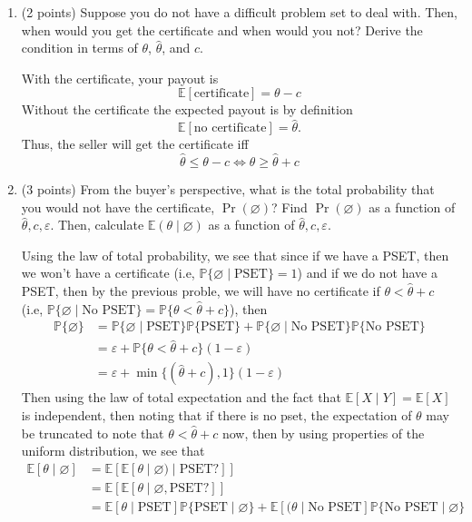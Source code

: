 \documentclass[11pt]{article}
\newcommand{\bbE}{\mathbb{E}}
\newcommand{\bbP}{\mathbb{P}}
\begin{document}
\begin{enumerate}[label=2.\arabic*.]
    \item (2 points) Suppose you do not have a difficult problem set to deal with. Then, when would you get the certificate and when would you not? Derive the condition in terms of $\theta$, $\hat{\theta}$, and $c$.
\begin{solution}
With the certificate,
your payout is 
\[\bbE[\text{certificate}] = \theta - c\] Without the certificate the expected payout is by definition
\[\bbE[\text{no certificate}]= \hat{\theta}.\] Thus, the seller will get the certificate iff 
\[\hat{\theta} \leq \theta - c \iff \boxed{\theta \geq \hat{\theta} + c}\]
\end{solution}
    \item (3 points) From the buyer’s perspective, what is the total probability that you would not have the certificate, $\Pr(\varnothing)$? Find $\Pr(\varnothing)$ as a function of $\hat{\theta}, c, \varepsilon$. Then, calculate $\mathbb{E}(\theta \mid \varnothing)$ as a function of $\hat{\theta}, c, \varepsilon$.
\begin{solution}
    Using the law of total probability, we see that since if we have a PSET, then we won't have a certificate (i.e, $\bbP\{\varnothing \mid \text{PSET}\} = 1$) and if we do not have a PSET, then by the previous proble, we will have no certificate if $\theta < \hat{\theta}+ c$ (i.e, $\bbP\{\varnothing \mid \text{No PSET\}} = \bbP\{\theta < \hat{\theta} + c\}$), then
\begin{align*}
    \bbP\{\varnothing\} &= \bbP\{\varnothing \mid \text{PSET}\}\bbP\{\text{PSET}\} + \bbP\{\varnothing \mid \text{No PSET\}}\bbP\{\text{No PSET}\}\\
    &= \varepsilon + \bbP\{\theta < \hat{\theta} + c\}(1-\varepsilon)\\
    &= \boxed{\varepsilon + \min\{(\hat{\theta} + c), 1\}(1-\varepsilon)}
\end{align*}
Then using the law of total expectation and the fact that $\bbE[X\mid Y] = \bbE[X]$ is independent, then noting that if there is no pset, the expectation of $\theta$ may be truncated to note that $\theta < \hat{\theta}  + c$ now, then by using properties of the uniform distribution, we see that
\begin{align*}
    \bbE[\theta \mid \varnothing] &= \bbE[\bbE[\theta \mid \varnothing) \mid \text{PSET?}]]\\
    &= \bbE[\bbE[\theta \mid \varnothing, \text{PSET?}]]\\
    &= \bbE[\theta \mid \text{PSET}]\bbP\{ \text{PSET} \mid \varnothing\} + \bbE[(\theta \mid \text{No PSET}]\bbP\{ \text{No PSET} \mid \varnothing\}\\

\end{align*}
\end{solution}
\end{enumerate}
\end{document}

